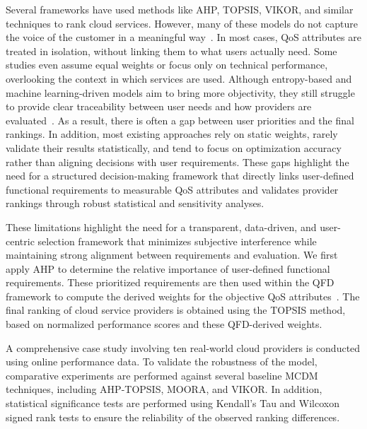 \documentclass[twocolumn]{svjour3}
\begin{document}
Several frameworks have used methods like AHP, TOPSIS, VIKOR, and similar techniques to rank cloud services. However, many of these models do not capture the voice of the customer in a meaningful way~\cite{opricovic2004compromise,thakur2022cloud}. In most cases, QoS attributes are treated in isolation, without linking them to what users actually need. Some studies even assume equal weights or focus only on technical performance, overlooking the context in which services are used. Although entropy-based and machine learning-driven models aim to bring more objectivity, they still struggle to provide clear traceability between user needs and how providers are evaluated~\cite{liu2020heterogeneous,monika2022framework}. As a result, there is often a gap between user priorities and the final rankings. In addition, most existing approaches rely on static weights, rarely validate their results statistically, and tend to focus on optimization accuracy rather than aligning decisions with user requirements. These gaps highlight the need for a structured decision-making framework that directly links user-defined functional requirements to measurable QoS attributes and validates provider rankings through robust statistical and sensitivity analyses.


These limitations highlight the need for a transparent, data-driven, and user-centric selection framework that minimizes subjective interference while maintaining strong alignment between requirements and evaluation. We first apply AHP to determine the relative importance of user-defined functional requirements. These prioritized requirements are then used within the QFD framework to compute the derived weights for the objective QoS attributes~\cite{sousa2017qfd}. The final ranking of cloud service providers is obtained using the TOPSIS method, based on normalized performance scores and these QFD-derived weights.

A comprehensive case study involving ten real-world cloud providers is conducted using online performance data. To validate the robustness of the model, comparative experiments are performed against several baseline MCDM techniques, including AHP-TOPSIS, MOORA, and VIKOR. In addition, statistical significance tests are performed using Kendall's Tau and Wilcoxon signed rank tests to ensure the reliability of the observed ranking differences.
\end{document}
